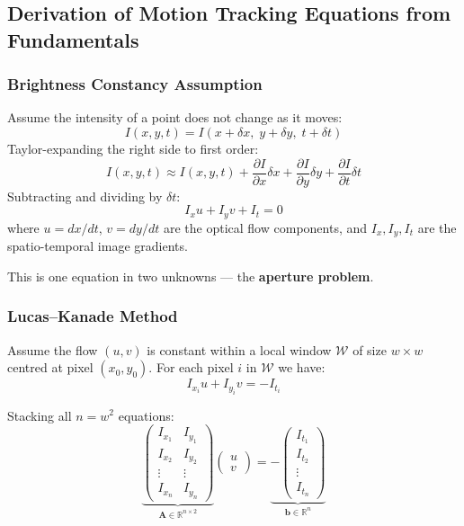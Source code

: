 \documentclass[12pt, a4paper]{article}
\begin{document}
\subsection{Derivation of Motion Tracking Equations from Fundamentals}
\label{sec:lk-derivation}

\subsubsection{Brightness Constancy Assumption}

Assume the intensity of a point does not change as it moves:
\[
  I(x, y, t) = I(x + \delta x,\; y + \delta y,\; t + \delta t)
\]
Taylor-expanding the right side to first order:
\[
  I(x,y,t) \approx I(x,y,t) + \frac{\partial I}{\partial x}\delta x + \frac{\partial I}{\partial y}\delta y + \frac{\partial I}{\partial t}\delta t
\]
Subtracting and dividing by $\delta t$:
\begin{equation}
  \boxed{I_x u + I_y v + I_t = 0}
  \label{eq:ofce}
\end{equation}
where $u = dx/dt$, $v = dy/dt$ are the optical flow components, and $I_x, I_y, I_t$ are the spatio-temporal image gradients.

This is one equation in two unknowns --- the \textbf{aperture problem}.

\subsubsection{Lucas--Kanade Method}

Assume the flow $(u, v)$ is constant within a local window $\mathcal{W}$ of size $w \times w$ centred at pixel $(x_0, y_0)$.  For each pixel $i$ in $\mathcal{W}$ we have:
\[
  I_{x_i} u + I_{y_i} v = -I_{t_i}
\]

Stacking all $n = w^2$ equations:
\[
  \underbrace{\begin{pmatrix}
    I_{x_1} & I_{y_1} \\
    I_{x_2} & I_{y_2} \\
    \vdots & \vdots \\
    I_{x_n} & I_{y_n}
  \end{pmatrix}}_{\mathbf{A} \in \mathbb{R}^{n \times 2}}
  \begin{pmatrix} u \\ v \end{pmatrix}
  =
  \underbrace{-\begin{pmatrix}
    I_{t_1} \\ I_{t_2} \\ \vdots \\ I_{t_n}
  \end{pmatrix}}_{\mathbf{b} \in \mathbb{R}^n}
\]
\end{document}
